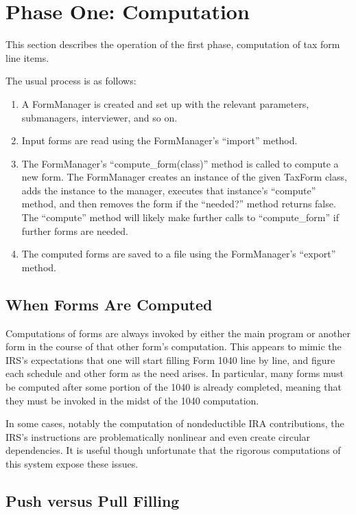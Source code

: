 \section{Phase One: Computation}

This section describes the operation of the first phase, computation of tax form
line items.

The usual process is as follows:
\begin{enumerate}
\item A FormManager is created and set up with the relevant parameters,
submanagers, interviewer, and so on.
\item Input forms are read using the FormManager's ``import'' method.
\item The FormManager's ``compute\_form(class)'' method is called to compute a
new form. The FormManager creates an instance of the given TaxForm class,
adds the instance to the manager, executes that instance's ``compute'' method,
and then removes the form if the ``needed?\@'' method returns false. The
``compute'' method will likely make further calls to ``compute\_form'' if
further forms are needed.
\item The computed forms are saved to a file using the FormManager's ``export''
method.
\end{enumerate}


\subsection{When Forms Are Computed}

Computations of forms are always invoked by either the main program or another
form in the course of that other form's computation. This appears to mimic the
IRS's expectations that one will start filling Form 1040 line by line, and
figure each schedule and other form as the need arises. In particular, many
forms must be computed after some portion of the 1040 is already completed,
meaning that they must be invoked in the midst of the 1040 computation.

In some cases, notably the computation of nondeductible IRA contributions, the
IRS's instructions are problematically nonlinear and even create circular
dependencies. It is useful though unfortunate that the rigorous computations of
this system expose these issues.



\subsection{Push versus Pull Filling}

